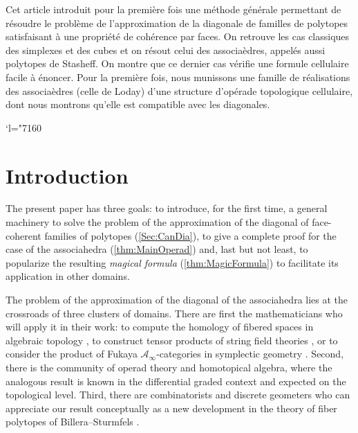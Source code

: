 \documentclass[JEP,XML,SOM,Unicode,NoFloatCountersInSection]{cedram}
\let\mathcal\mathscr
\newcommand{\Changel}{\mathcode`l="7160}
\theoremstyle{plain}
\theoremstyle{definition}
\begin{document}




\begin{altabstract}
Cet article introduit pour la première fois une méthode générale permettant de résoudre le problème de l’approximation de la diagonale de familles de polytopes satisfaisant à une propriété de cohérence par faces. On retrouve les cas classiques des simplexes et des cubes et on résout celui des associaèdres, appelés aussi polytopes de Stasheff. On montre que ce dernier cas vérifie une formule cellulaire facile à énoncer. Pour la première fois, nous munissons une famille de réalisations des associaèdres (celle de Loday) d’une structure d’opérade topologique cellulaire, dont nous montrons qu’elle est compatible avec les diagonales.
\end{altabstract}
\maketitle
\vspace*{-\baselineskip}
\tableofcontents
\mainmatter

\Changel
\vspace*{-2\baselineskip}\vskip0pt\enlargethispage{.5\baselineskip}%
\section*{Introduction}

The present paper has three goals: to introduce, for the first time, a general machinery to solve the problem of the approximation of the diagonal of face-coherent families of polytopes (\cref{Sec:CanDia}), to give a complete proof for the case of the associahedra (\cref{thm:MainOperad}) and, last but not least, to popularize the resulting \emph{magical formula} (\cref{thm:MagicFormula}) to facilitate its application in other domains.

The problem of the approximation of the diagonal of the associahedra lies at the crossroads of three clusters of domains.
There are first the mathematicians who will apply it in their work:
to compute the homology of fibered spaces in algebraic topology \cite{Brown59, Proute11}, to construct tensor products of string field theories
\cite{GaberdielZwiebach97}, or to consider the product of Fukaya $\mathcal{A}_\infty$-categories in symplectic geometry \cite{Seidel08, Amorim17}. Second, there is the community of operad theory and homotopical algebra, where the analogous result is known in the differential graded context \cite{SaneblidzeUmble04, MarklShnider06} and expected on the topological level. Third, there are combinatorists and discrete geometers who can appreciate our result conceptually as a new development in the theory of fiber polytopes of Billera--Sturmfels \cite{BilleraSturmfels92}.
\end{document}
